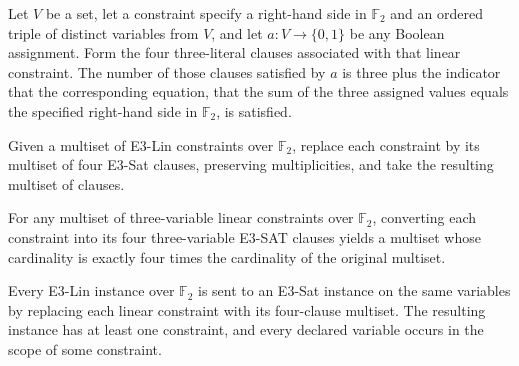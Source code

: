 \begin{theorem}
\label{FABL.sum_satisfiedIndicator_e3LinConstraintClauses}
\leanok
{}
Let $V$ be a set, let a constraint specify a right-hand side in $\mathbb F_2$ and an
ordered triple of distinct variables from $V$, and let $a:V\to\{0,1\}$ be any Boolean
assignment. Form the four three-literal clauses associated with that linear constraint.
The number of those clauses satisfied by $a$ is three plus the indicator that the
corresponding equation, that the sum of the three assigned values equals the specified
right-hand side in $\mathbb F_2$, is satisfied.
\end{theorem}

\begin{definition}
\label{FABL.e3LinConstraintsToE3Sat}
\leanok
{}
Given a multiset of E3-Lin constraints over $\mathbb{F}_2$, replace each constraint by
its multiset of four E3-Sat clauses, preserving multiplicities, and take the resulting
multiset of clauses.
\end{definition}

\begin{theorem}
\label{FABL.card_e3LinConstraintsToE3Sat}
\leanok
{}
For any multiset of three-variable linear constraints over $\mathbb{F}_2$, converting
each constraint into its four three-variable E3-SAT clauses yields a multiset whose
cardinality is exactly four times the cardinality of the original multiset.
\end{theorem}

\begin{definition}
\label{FABL.e3LinToE3Sat}
\leanok
{}
Every E3-Lin instance over $\mathbb{F}_2$ is sent to an E3-Sat instance on the same
variables by replacing each linear constraint with its four-clause multiset. The
resulting instance has at least one constraint, and every declared variable occurs in
the scope of some constraint.
\end{definition}

